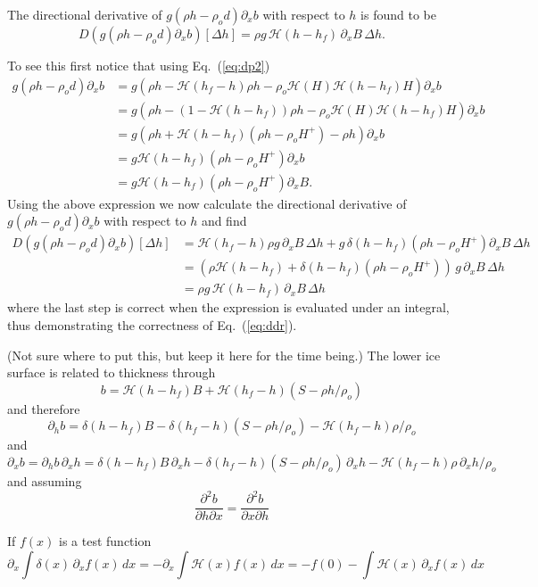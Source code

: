 \documentclass[10pt,a4paper]{book}
\newcommand{\He}{\mathcal{H}}
\newcommand{\p}{\partial}
\begin{document}
The directional derivative of $g(\rho h -\rho_o d) \p_x b$ with respect to $h$ is found to be
\begin{equation}
D\left (g(\rho h -\rho_o d) \p_x b\right )[\Delta h]= \rho g \, \He(h-h_f)   \, \p_x B \, \Delta h .
\label{eq:ddr}
\end{equation}

To see this first notice that using Eq.~(\ref{eq:dp2})
\begin{align*}
g (\rho h - \rho_o d) \p_x b &= g(\rho h - \He(h_f-h) \rho h - \rho_o \He(H) \He(h-h_f) H) \p_x b \\
                            &= g(\rho h -(1-\He(h-h_f)) \rho h - \rho_o \He(H) \He(h-h_f) H) \p_x b \\
                            &=g(\rho h +\He(h-h_f) ( \rho h-\rho_o H^{+})-\rho h) \p_x b \\
                            &=g \He(h-h_f) (\rho h- \rho_o H^{+}) \p_x b \\
                            &=g \He(h-h_f) (\rho h - \rho_o H^{+} ) \p_x B.
\end{align*}
Using the above expression we now calculate the directional derivative of $g(\rho h -\rho_o d) \p_x b$ with respect to
$h$ and find
\begin{align*}
D\left (g(\rho h -\rho_o d) \p_x b\right )[\Delta h]
&=\He(h_f-h) \rho g \, \p_x B \, \Delta h + g\, \delta(h-h_f) (\rho h - \rho_o H^{+} )\p_x B \, \Delta h\\
&= \left ( \rho \He(h-h_f)   + \delta(h-h_f) (\rho h - \rho_o H^{+} ) \right ) \, g \, \p_x B \, \Delta h\\
&=  \rho g \, \He(h-h_f)   \, \p_x B \, \Delta h
\end{align*}
where the last step is correct when the expression is evaluated under an integral, thus demonstrating the correctness of Eq.~(\ref{eq:ddr}).


(Not sure where to put this, but keep it here for the time being.)
The lower ice surface is related to thickness through
\[
b=\He(h-h_f) B + \He(h_f-h) (S-\rho h /\rho_o)
\]
and therefore
\[
\p_h b= \delta(h-h_f) B - \delta(h_f-h) (S-\rho h /\rho_o) - \He(h_f-h) \rho /\rho_o
\]
and
\[
\p_x b= \p_h b \, \p_x h  = \delta(h-h_f) B \, \p_x h - \delta(h_f-h) (S-\rho h /\rho_o) \, \p_x h - \He(h_f-h) \rho \, \p_x h /\rho_o
\]
and assuming
\[
\frac{\p^2 b}{\p h \p x} = \frac{\p^2 b}{\p x \p h}
\]

If $f(x)$ is a test function
\[
\p_x \int \delta(x) \, \p_x f(x) \, dx= - \p_x \int \He(x) f(x) \, dx = - f(0) - \int \He(x) \, \p_x f(x) \, dx
\]
\end{document}
